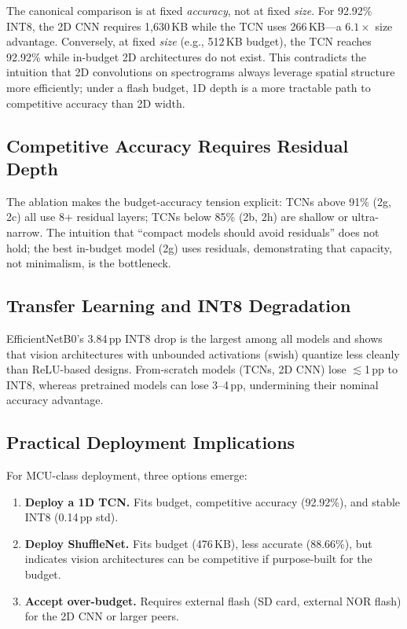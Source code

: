 \documentclass[conference]{IEEEtran}
\begin{document}
The canonical comparison is at fixed \emph{accuracy}, not at fixed \emph{size}. For 92.92\% INT8, the 2D CNN requires 1{,}630\,KB while the TCN uses 266\,KB---a $6.1\times$ size advantage. Conversely, at fixed \emph{size} (e.g., 512\,KB budget), the TCN reaches 92.92\% while in-budget 2D architectures do not exist. This contradicts the intuition that 2D convolutions on spectrograms always leverage spatial structure more efficiently; under a flash budget, 1D depth is a more tractable path to competitive accuracy than 2D width.

\subsection{Competitive Accuracy Requires Residual Depth}

The ablation makes the budget-accuracy tension explicit: TCNs above 91\% (2g, 2c) all use 8+ residual layers; TCNs below 85\% (2b, 2h) are shallow or ultra-narrow. The intuition that ``compact models should avoid residuals'' does not hold; the best in-budget model (2g) uses residuals, demonstrating that capacity, not minimalism, is the bottleneck.

\subsection{Transfer Learning and INT8 Degradation}

EfficientNetB0's 3.84\,pp INT8 drop is the largest among all models and shows that vision architectures with unbounded activations (swish) quantize less cleanly than ReLU-based designs. From-scratch models (TCNs, 2D CNN) lose $\lesssim$1\,pp to INT8, whereas pretrained models can lose 3--4\,pp, undermining their nominal accuracy advantage.

\subsection{Practical Deployment Implications}

For MCU-class deployment, three options emerge:
\begin{enumerate}
  \item \textbf{Deploy a 1D TCN.} Fits budget, competitive accuracy (92.92\%), and stable INT8 (0.14\,pp std).
  \item \textbf{Deploy ShuffleNet.} Fits budget (476\,KB), less accurate (88.66\%), but indicates vision architectures can be competitive if purpose-built for the budget.
  \item \textbf{Accept over-budget.} Requires external flash (SD card, external NOR flash) for the 2D CNN or larger peers.
\end{enumerate}
\end{document}
